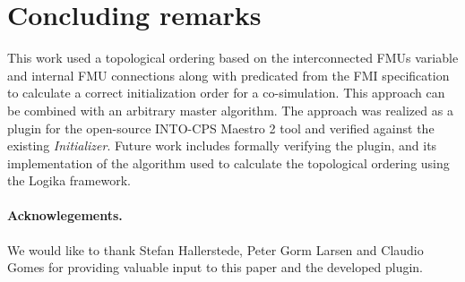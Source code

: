 \section{Concluding remarks}\label{sc:summary}
This work used a topological ordering based on the interconnected FMUs variable and internal FMU connections along with predicated from the FMI specification to calculate a correct initialization order for a co-simulation. This approach can be combined with an arbitrary master algorithm. 
The approach was realized as a plugin for the open-source INTO-CPS Maestro 2 tool and verified against the existing \textit{Initializer}.
Future work includes formally verifying the plugin, and its implementation of the algorithm used to calculate the topological ordering using the Logika framework.

\paragraph*{\textbf{Acknowlegements.}}We would like to thank Stefan Hallerstede, Peter Gorm Larsen and Claudio Gomes for providing valuable input to this paper and the developed plugin.